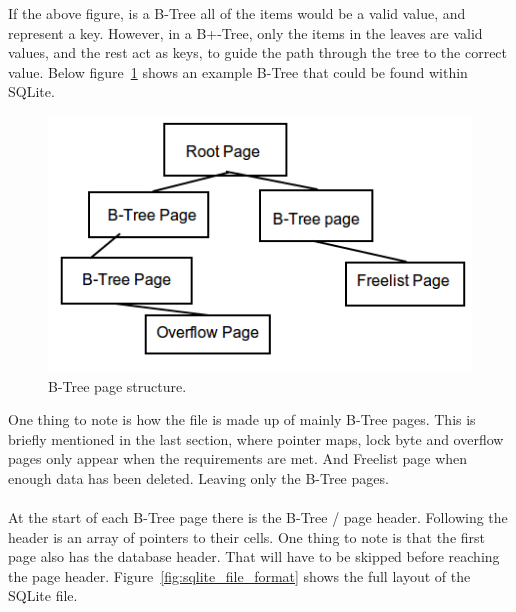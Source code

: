 If the above figure, is  a B-Tree all of the items would be a valid value, and represent a key. However, in a B+-Tree, only the items in the leaves are valid values, and the rest act as keys, to guide the path through the tree to the correct value. Below figure~\ref{fig:sqlite_btree_figure} shows an example B-Tree that could be found within SQLite.

\begin{figure}[H]
	\centering
	\includegraphics[scale=0.48]{images/sqlite_btree_format.png}
	\caption{B-Tree page structure.}
	\label{fig:sqlite_btree_figure}
\end{figure}

One thing to note is how the file is made up of mainly B-Tree pages. This is briefly mentioned in the last section, where pointer maps, lock byte and overflow pages only appear when the requirements are met. And Freelist page when enough data has been deleted. Leaving only the B-Tree pages.
\\\\
At the start of each B-Tree page there is the B-Tree / page header. Following the header is an array of pointers to their cells. One thing to note is that the first page also has the database header. That will have to be skipped before reaching the page header. Figure~\ref{fig:sqlite_file_format} shows the full layout of the SQLite file.

